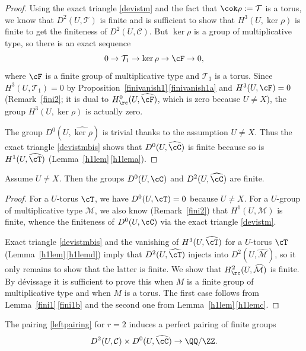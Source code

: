 \begin{proof} Using the exact triangle \eqref{devistm} and the fact that
$\cok \rho:=\mathcal T$ is a torus, we know that
$D^2(U,\mathcal T)$ is finite and is sufficient to show that
$H^3(U,\ker \rho)$ is finite to get the finiteness of $D^2(U,\mathcal C)$.
But $\ker \rho$ is a group of multiplicative
type, so there is an exact sequence
\[
0 \to \mathcal T_1 \to \ker \rho \to \cF \to 0,
\]
where $\cF$ is a finite group of multiplicative type and
$\mathcal T_1$ is a torus.
Since $H^3(U,\mathcal T_1)=0$ by Proposition~\ref{finivanish1}\,\eqref{finivanish1a} and
$H^3(U,\cF)=0$ (\cf Remark~\ref{fini2};
it is dual to $H^0_\rc(U,\widehat \cF)$,
which is zero because $U \neq X$), the group $H^3(U,\ker \rho)$
is actually zero.

The group $D^0(U,\widehat {\ker \rho})$ is trivial thanks to the
assumption $U \neq X$. Thus the exact triangle \eqref{devistmbis}
shows that $D^0(U,\widehat \cC)$ is finite because
so is $H^1(U,\widehat \cT)$ (Lemma~\ref{h1lem}\,\eqref{h1lema}).
\end{proof}

\begin{lem} \label{d0lem}
Assume $U \neq X$. Then the groups $D^0(U,\cC)$ and $D^2(U,\widehat \cC)$
are finite.
\end{lem}

\begin{proof} For a $U$-torus $\cT$, we have $D^0(U,\cT)=0$ because $U \neq X$.
For a $U$-group of multiplicative type $\mathcal M$, we also know
(Remark~\ref{fini2}) that $H^1(U,\mathcal M)$ is finite, whence
the finiteness of $D^0(U,\cC)$ via the
exact triangle \eqref{devistm}.

Exact triangle \eqref{devistmbis} and the vanishing of $H^3(U, \widehat \cT)$
for a $U$-torus $\cT$ (Lemma~\ref{h1lem}\,\eqref{h1lemd}) imply that $D^2(U,\widehat \cT)$
injects into $D^2(U, \widehat {\mathcal M})$, so it only remains to show
that the latter is finite. We show that $H^2_\rc(U,\widehat
{\mathcal M})$ is finite. By dévissage it is sufficient to prove this
when $M$ is a finite group of multiplicative type and when $M$ is
a torus. The first case follows from Lemma~\ref{fini1}\,\eqref{fini1b} and the second one
from Lemma~\ref{h1lem}\,\eqref{h1lemc}.
\end{proof}

\begin{prop} \label{duald2}
The pairing \eqref{leftpairing} for $r=2$
induces a perfect pairing of finite groups
\begin{equation} \label{d2pairing}
D^2(U, \mathcal C) \times D^0(U,\widehat \cC) \to \QQ/\ZZ.
\end{equation}
\end{prop}


